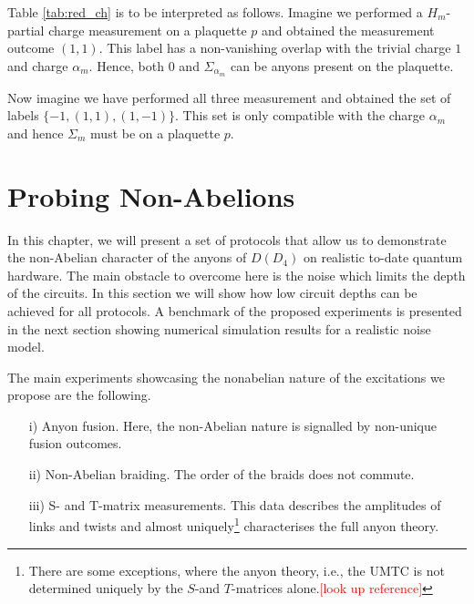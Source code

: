 \documentclass[two column]{article}
\newcommand{\caro}[1]{\textcolor{red}{[#1]}}
\begin{document}

Table \ref{tab:red_ch} is to be interpreted as follows. Imagine we performed a $H_m$-partial charge measurement on a plaquette $p$ and obtained the measurement outcome $(1,1)$. This label has a non-vanishing overlap with the trivial charge $1$ and charge $\alpha_m$. Hence, both $0$ and $\Sigma_{\alpha_m}$ can be anyons present on the plaquette.

Now imagine we have performed all three measurement and obtained the set of labels $\{-1, (1, 1), (1, -1)\}$. This set is only compatible with the charge $\alpha_m$ and hence $\Sigma_m$ must be on a plaquette $p$.



\section{Probing Non-Abelions}

In this chapter, we will present a set of protocols that allow us to demonstrate the non-Abelian character of the anyons of $D(D_4)$ on realistic to-date quantum hardware. The main obstacle to overcome here is the noise which limits the depth of the circuits. In this section we will show how low circuit depths can be achieved for all protocols. A benchmark of the proposed experiments is presented in the next section showing numerical simulation results for a realistic noise model.


The main experiments showcasing the nonabelian nature of the excitations we propose are the following.
\begin{itemize}

\item[i)] Anyon fusion. Here, the non-Abelian nature is signalled by non-unique fusion outcomes.

\item[ii)] Non-Abelian braiding. The order of the braids does not commute.

\item[iii)] S- and T-matrix measurements. This data describes the amplitudes of links and twists and almost uniquely\footnote{There are some exceptions, where the anyon theory, i.e., the UMTC is not determined uniquely by the $S$-and $T$-matrices alone.\caro{look up reference}} characterises the full anyon theory.
\end{itemize}
\end{document}
